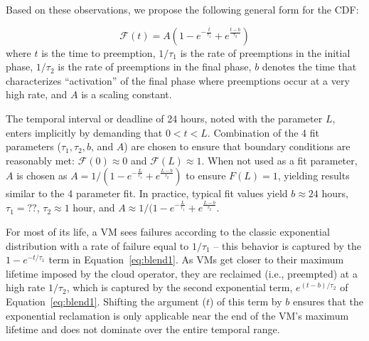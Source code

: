 Based on these observations, we propose the following general form for the CDF:

\vspace*{\subsecspace}
\begin{equation}
  \label{eq:blend1}
  \boxed{
  \mathscr{F}\left(t\right) = A\left(1-e^{-\frac{t}{\tau_1}} + e^{\frac{t-b}{\tau_2}}\right)}
  \end{equation}
\noindent where $t$ is the time to preemption, $1/\tau_1$ is the rate of preemptions in the initial phase, $1/\tau_2$ is the rate of preemptions in the final phase, $b$ denotes the time that characterizes ``activation'' of the final phase where preemptions occur at a very high rate, and $A$ is a scaling constant. 

The temporal interval or deadline of 24 hours, noted with the parameter $L$, enters implicitly by demanding that $0 < t < L$. Combination of the 4 fit parameters ($\tau_1, \tau_2, b$, and $A$) are chosen to ensure that boundary conditions are reasonably met: $\mathscr{F}(0) \approx 0$ and $\mathscr{F}(L) \approx 1$. When not used as a fit parameter, $A$ is chosen as $A = 1/(1-e^{-\frac{L}{\tau_1}} + e^{\frac{L-b}{\tau_2}})$ to ensure $F(L) = 1$, yielding results similar to the 4 parameter fit. 
In practice, typical fit values yield $b \approx 24$ hours, $\tau_1 = ??$, $\tau_2 \approx 1$ hour, and $A \approx 1/(1-e^{-\frac{L}{\tau_1}} + e^{\frac{L-b}{\tau_2}}$.  




For most of its life, a VM sees failures according to the classic exponential distribution with a rate of failure equal to $1/\tau_1$ -- this behavior is captured by the $1-e^{-t/\tau_1}$ term in Equation~\ref{eq:blend1}. 
As VMs get closer to their maximum lifetime imposed by the cloud operator, they are reclaimed (i.e., preempted) at a high rate $1/\tau_2$, which is captured by the second exponential term, $e^{(t-b)/\tau_2}$ of Equation~\ref{eq:blend1}. 
Shifting the argument ($t$) of this term by $b$ ensures that the exponential reclamation is only applicable near the end of the VM's maximum lifetime and does not dominate over the entire temporal range. 

